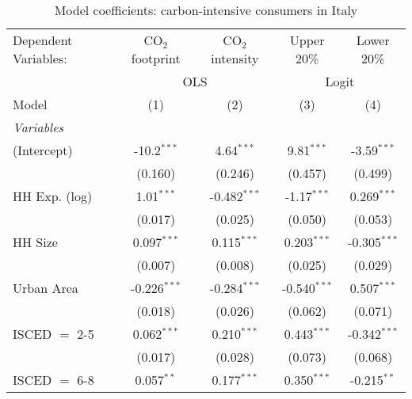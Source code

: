 
\begin{table}[htbp!]
   \centering
   \small
   \begin{adjustbox}{width = 1\textwidth, max height = 0.95\textheight, center}
      \begin{threeparttable}[b]
         \caption{\label{tab:Logit_1_ITA} Model coefficients: carbon-intensive consumers in Italy}
         \begin{tabular}{lcccc}
            \tabularnewline \midrule \midrule
            Dependent Variables: & CO$_{2}$ footprint & CO$_{2}$ intensity & Upper 20\%     & Lower 20\%\\   
             & \multicolumn{2}{c}{OLS} & \multicolumn{2}{c}{Logit} \\ 
            Model                & (1)                & (2)                & (3)            & (4)\\  
            \midrule
            \emph{Variables}\\
            (Intercept)          & -10.2$^{***}$      & 4.64$^{***}$       & 9.81$^{***}$   & -3.59$^{***}$\\   
                                 & (0.160)            & (0.246)            & (0.457)        & (0.499)\\   
            HH Exp. (log)        & 1.01$^{***}$       & -0.482$^{***}$     & -1.17$^{***}$  & 0.269$^{***}$\\   
                                 & (0.017)            & (0.025)            & (0.050)        & (0.053)\\   
            HH Size              & 0.097$^{***}$      & 0.115$^{***}$      & 0.203$^{***}$  & -0.305$^{***}$\\   
                                 & (0.007)            & (0.008)            & (0.025)        & (0.029)\\   
            Urban Area           & -0.226$^{***}$     & -0.284$^{***}$     & -0.540$^{***}$ & 0.507$^{***}$\\   
                                 & (0.018)            & (0.026)            & (0.062)        & (0.071)\\   
            ISCED $=$ 2-5        & 0.062$^{***}$      & 0.210$^{***}$      & 0.443$^{***}$  & -0.342$^{***}$\\   
                                 & (0.017)            & (0.028)            & (0.073)        & (0.068)\\   
            ISCED $=$ 6-8        & 0.057$^{**}$       & 0.177$^{***}$      & 0.350$^{***}$  & -0.215$^{**}$\\   

\end{tabular}
\end{threeparttable}
\end{adjustbox}
\end{table}
